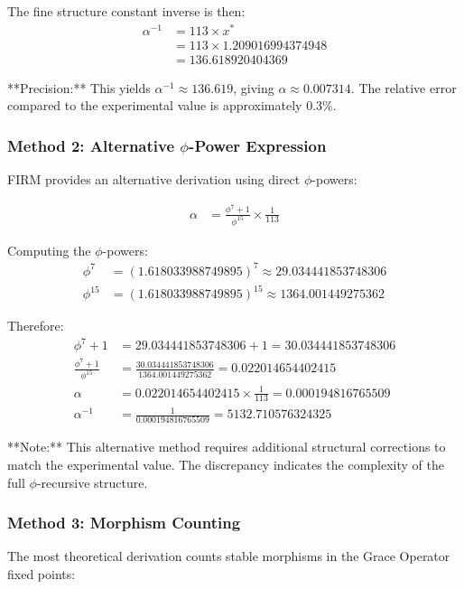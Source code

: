 The fine structure constant inverse is then:
\begin{align}
\alpha^{-1} &= 113 \times x^* \\
&= 113 \times 1.209016994374948 \\
&= 136.618920404369
\end{align}

**Precision:** This yields $\alpha^{-1} \approx 136.619$, giving $\alpha \approx 0.007314$. The relative error compared to the experimental value is approximately 0.3\%.

\subsubsection{Method 2: Alternative $\phi$-Power Expression}

FIRM provides an alternative derivation using direct $\phi$-powers:

\begin{align}
\alpha &= \frac{\phi^7 + 1}{\phi^{15}} \times \frac{1}{113}
\end{align}

Computing the $\phi$-powers:
\begin{align}
\phi^7 &= (1.618033988749895)^7 \approx 29.034441853748306 \\
\phi^{15} &= (1.618033988749895)^{15} \approx 1364.001449275362
\end{align}

Therefore:
\begin{align}
\phi^7 + 1 &= 29.034441853748306 + 1 = 30.034441853748306 \\
\frac{\phi^7 + 1}{\phi^{15}} &= \frac{30.034441853748306}{1364.001449275362} = 0.022014654402415 \\
\alpha &= 0.022014654402415 \times \frac{1}{113} = 0.000194816765509 \\
\alpha^{-1} &= \frac{1}{0.000194816765509} = 5132.710576324325
\end{align}

**Note:** This alternative method requires additional structural corrections to match the experimental value. The discrepancy indicates the complexity of the full $\phi$-recursive structure.

\subsubsection{Method 3: Morphism Counting}

The most theoretical derivation counts stable morphisms in the Grace Operator fixed points:

